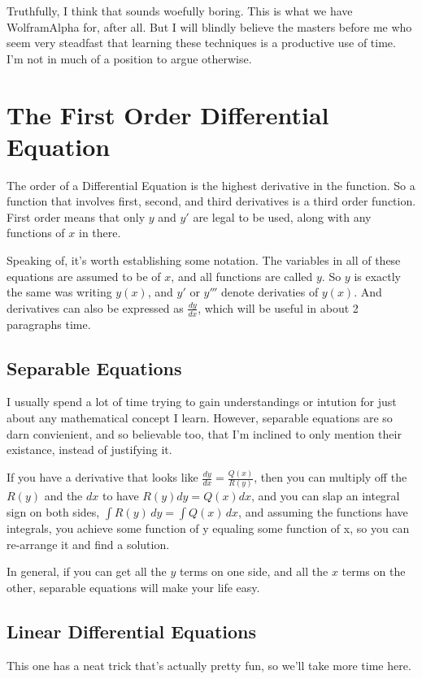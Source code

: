\documentclass[12pt, letterpaper]{article}
\begin{document}
Truthfully, I think that sounds woefully boring. This is what we have WolframAlpha for, after all.
But I will blindly believe the masters before me who seem very steadfast that
learning these techniques is a productive use of time.
I'm not in much of a position to argue otherwise.


\section{The First Order Differential Equation}
The order of a Differential Equation is the highest derivative in the function.
So a function that involves first, second, and third derivatives is a third order function.
First order means that only $y$ and $y'$ are legal to be used, along with any functions of $x$ in there.

Speaking of, it's worth establishing some notation.
The variables in all of these equations are assumed to be of $x$,
and all functions are called $y$.
So $y$ is exactly the same was writing $y(x)$, and $y'$ or $y'''$ denote derivaties of $y(x)$.
And derivatives can also be expressed as $\frac{dy}{dx}$, which will be useful in about 2 paragraphs time.

\subsection{Separable Equations}
I usually spend a lot of time trying to gain understandings or intution for 
just about any mathematical concept I learn. However,
separable equations are so darn convienient, and so believable too,
that I'm inclined to only mention their existance, instead of justifying it.

If you have a derivative that looks like $\frac{dy}{dx} = \frac{Q(x)}{R(y)}$,
then you can multiply off the $R(y)$ and the $dx$ to have $R(y) dy = Q(x) dx$,
and you can slap an integral sign on both sides, $\int R(y) \,dy = \int Q(x) \,dx$,
and assuming the functions have integrals, you achieve some function of y equaling some function of x,
so you can re-arrange it and find a solution.

In general, if you can get all the $y$ terms on one side, and all the $x$ terms on the other,
separable equations will make your life easy.

\subsection{Linear Differential Equations}
This one has a neat trick that's actually pretty fun, so we'll take more time here.
\end{document}
